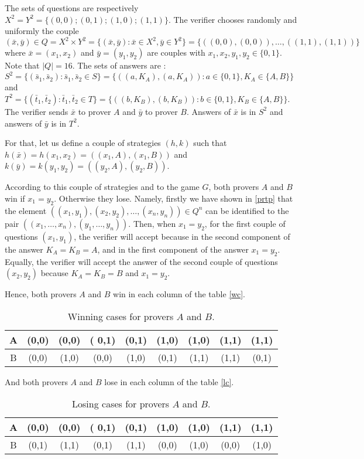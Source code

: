 The sets of questions are respectively $X^2=Y^2=\{(0,0);(0,1);(1,0);(1,1)\}.$ The verifier chooses randomly and uniformly the couple $(\bar{x}, \bar{y}) \in Q=X^2 \times Y^2=\{(\bar{x}, \bar{y}): \bar{x} \in X^2, \bar{y} \in Y^2 \}=\{((0,0),(0,0)), \ldots,  ((1,1),(1,1))\}$ where $\bar{x}=(x_1,x_2)$ and $ \bar{y}=(y_1,y_2)$ are couples with $x_1, x_2, y_1, y_2 \in \{0,1\}$. Note that $|Q|=16.$ The sets of answers are :$S^2=\{(\bar{s}_1, \bar{s}_2): \bar{s}_1, \bar{s}_2 \in S\}=   \{((a,K_A), (a,K_A)): a \in \{0,1\}, K_A \in \{A,B\} \}$ and $T^2=\{(\bar{t}_1, \bar{t}_2): \bar{t}_1, \bar{t}_2 \in T\}= \{((b,K_B), (b,K_B)): b \in \{0,1\}, K_B \in \{A,B\} \}$. The verifier sends $\bar{x}$ to prover $A$ and $\bar{y}$ to prover $B$. Answers of $\bar{x}$ is in $S^2$ and answers of $\bar{y}$ is in $T^2$. 


For that, let us define a couple of strategies $(h,k)$ such that $h(\bar{x})=h(x_1,x_2)=((x_1,A),(x_1,B))$ and $k(\bar{y})=k(y_1,y_2)=((y_2,A),(y_2,B))$.

According to this couple of strategies and to the game $G$, both provers $A$ and $B$ win if $x_1=y_2$. Otherwise they lose. Namely, firstly we have shown in \eqref{prtp} that the element  $((x_1, y_1),(x_2,y_2 ), \ldots, (x_n, y_n)) \in Q^n$ can be identified to the pair $((x_1,\ldots, x_n), (y_1, \ldots, y_n)).$ Then, when $x_1=y_2$, for the first couple of questions $(x_1,y_1)$, the verifier will accept because in the second component of the answer $K_A=K_B=A$, and  in the first component of the answer $x_1=y_2$. Equally, the verifier will accept the answer of the second couple of questions $(x_2,y_2)$ because $K_A=K_B=B$ and $x_1=y_2.$

Hence, both provers $A$ and $B$ win in each column of the table \eqref{wc}.
\begin{table}[h]
\centering
\begin{tabular}{c|cccccccc} 
A & (0,0) & (0,0) &( 0,1) & (0,1) & (1,0) & (1,0) & (1,1) & (1,1) \\ 
\hline 
B & (0,0) & (1,0) & (0,0) & (1,0) & (0,1) & (1,1) & (1,1) & (0,1) 
\end{tabular} 
\caption{Winning cases for provers $A$ and $B.$} \label{wc}
\end{table}

And both provers $A$ and $B$ lose in each column of the table \eqref{lc}.
\begin{table}[h]
\centering
\begin{tabular}{c|cccccccc} 
A & (0,0) & (0,0) &( 0,1) & (0,1) & (1,0) & (1,0) & (1,1) & (1,1) \\ 
\hline 
B & (0,1) & (1,1) & (0,1) & (1,1) & (0,0) & (1,0) & (0,0) & (1,0) 
\end{tabular}
\caption{Losing cases for provers $A$ and $B.$} \label{lc}
\end{table} 

